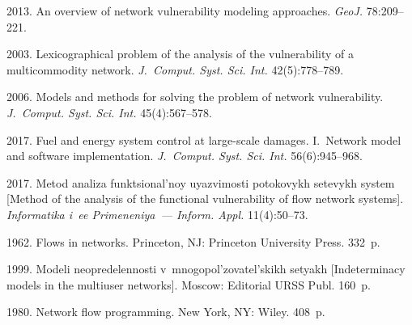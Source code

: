   \begin{multicols}{2}

\renewcommand{\bibname}{\protect\rmfamily References}

{\small\frenchspacing
 {%
 \begin{thebibliography}{9}
 2013.  
An overview of network vulnerability modeling approaches. \textit{GeoJ.}
78:209--221.
 
 2003. Lexicographical problem of the analysis of the 
vulnerability of a multicommodity network.
\textit{J.~Comput. Syst. Sci. Int.} 42(5):778--789.   

 2006. 
Models and methods for solving the problem of network vulnerability. 
\textit{J.~Comput. Syst. Sci. Int.} 45(4):567--578.

2017. Fuel and energy system control at large-scale damages. 
I.~Network model and software implementation.  
\textit{J.~Comput. Syst. Sci. Int.} 56(6):945--968. 

2017. Metod analiza funktsional'noy uyazvimosti potokovykh setevykh system 
[Method of the analysis of the functional vulnerability of flow network systems]. 
\textit{Informatika i~ee Primeneniya~--- Inform. Appl.} 11(4):50--73.

 1962.  Flows in networks. 
Princeton, NJ: Princeton University Press. 332~p.

 1999. Modeli neopredelennosti 
v~mnogopol'zovatel'skikh setyakh [Indeterminacy models in the multiuser networks].  
Moscow: Editorial URSS Publ. 160~p.

 1980. Network flow programming. 
New York, NY: Wiley. 408~p.

\end{thebibliography}

 }
 }

\end{multicols}

\vspace*{-9pt}

